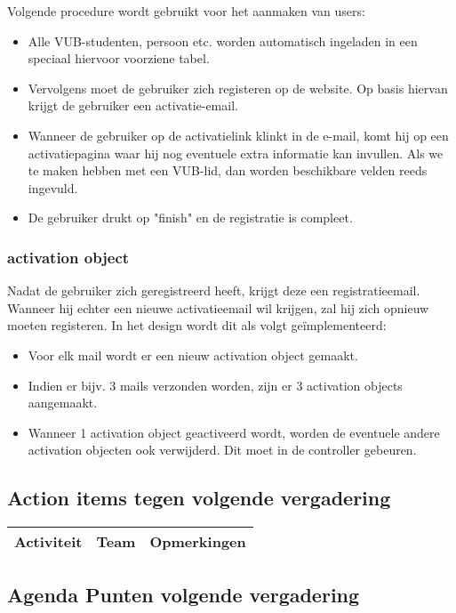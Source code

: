 Volgende procedure wordt gebruikt voor het aanmaken van users:
\begin{itemize}
	\item Alle VUB-studenten, persoon etc. worden automatisch ingeladen in een speciaal hiervoor voorziene tabel.
	\item Vervolgens moet de gebruiker zich registeren op de website. Op basis hiervan krijgt de gebruiker een activatie-email.
	\item Wanneer de gebruiker op de activatielink klinkt in de e-mail, komt hij op een activatiepagina waar hij nog eventuele extra informatie kan invullen. Als we te maken hebben met een VUB-lid, dan worden beschikbare velden reeds ingevuld.
	\item De gebruiker drukt op "finish" en de registratie is compleet.
\end{itemize}

\subsubsection{activation object}
Nadat de gebruiker zich geregistreerd heeft, krijgt deze een registratieemail. Wanneer hij echter een nieuwe activatieemail wil krijgen, zal hij zich opnieuw moeten registeren. In het design wordt dit als volgt ge\"{i}mplementeerd:
\begin{itemize}
	\item Voor elk mail wordt er een nieuw activation object gemaakt.
	\item Indien er bijv. 3 mails verzonden worden, zijn er 3 activation objects aangemaakt.
	\item Wanneer 1 activation object geactiveerd wordt, worden de eventuele andere activation objecten ook verwijderd. Dit moet in de controller gebeuren.
\end{itemize}


\subsection{Action items tegen volgende vergadering}
\begin{table} [H]
	\centering
	\begin{tabular} {l|l|l}
		\textbf{Activiteit} & \textbf{Team} & \textbf{Opmerkingen} \\
		
		\hline
	\end{tabular}
\end{table}

\subsection{Agenda Punten volgende vergadering}



